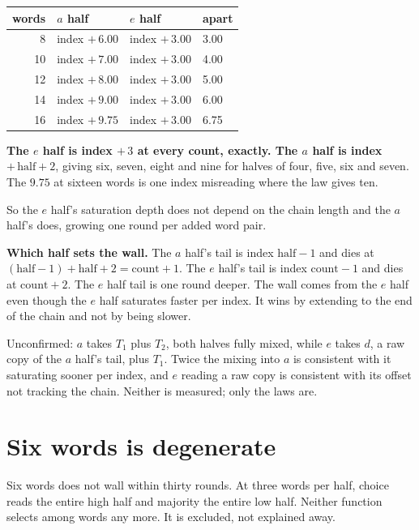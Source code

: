 \begin{center}
\begin{tabular}{rlll}
\toprule
words & \(a\) half & \(e\) half & apart \\
\midrule
8 & index \(+\, 6.00\) & index \(+\, 3.00\) & 3.00 \\
10 & index \(+\, 7.00\) & index \(+\, 3.00\) & 4.00 \\
12 & index \(+\, 8.00\) & index \(+\, 3.00\) & 5.00 \\
14 & index \(+\, 9.00\) & index \(+\, 3.00\) & 6.00 \\
16 & index \(+\, 9.75\) & index \(+\, 3.00\) & 6.75 \\
\bottomrule
\end{tabular}
\end{center}

\textbf{The \(e\) half is index \(+\,3\) at every count, exactly. The \(a\) half is index \(+\, \mathrm{half} + 2\)}, giving six, seven, eight and nine for halves of four, five, six and seven. The \(9.75\) at sixteen words is one index misreading where the law gives ten.

So the \(e\) half's saturation depth does not depend on the chain length and the \(a\) half's does, growing one round per added word pair.

\textbf{Which half sets the wall.} The \(a\) half's tail is index \(\mathrm{half}-1\) and dies at \((\mathrm{half}-1) + \mathrm{half} + 2 = \mathrm{count} + 1\). The \(e\) half's tail is index \(\mathrm{count}-1\) and dies at \(\mathrm{count} + 2\). The \(e\) half tail is one round deeper. The wall comes from the \(e\) half even though the \(e\) half saturates faster per index. It wins by extending to the end of the chain and not by being slower.

Unconfirmed: \(a\) takes \(T_1\) plus \(T_2\), both halves fully mixed, while \(e\) takes \(d\), a raw copy of the \(a\) half's tail, plus \(T_1\). Twice the mixing into \(a\) is consistent with it saturating sooner per index, and \(e\) reading a raw copy is consistent with its offset not tracking the chain. Neither is measured; only the laws are.

\section{Six words is degenerate}

Six words does not wall within thirty rounds. At three words per half, choice reads the entire high half and majority the entire low half. Neither function selects among words any more. It is excluded, not explained away.
